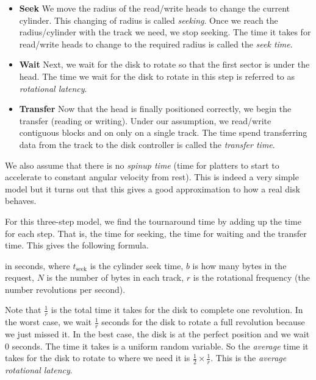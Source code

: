 \begin{itemize}   
\renewcommand{\labelitemi}{$\Box$}
\item \textbf{Seek}
We move the radius of the read/write heads to change the current cylinder.
This changing of radius is called \textit{seeking}. Once we reach the 
radius/cylinder with the track we need, we stop seeking.
The time it takes for read/write heads to change to the required radius is 
called the \textit{seek time}.
\item \textbf{Wait}
Next, we wait for the disk to rotate so that the first sector is under the head.
The time we wait for the disk to rotate in this step is referred to as 
\textit{rotational latency}.
\item \textbf{Transfer}
Now that the head is finally positioned correctly, we begin the transfer 
(reading or writing). Under our assumption, we read/write contiguous blocks 
and on only on a single track.
The time spend transferring data from the track to the disk controller
is called the \textit{transfer time}.
\end{itemize}

We also assume that there is no \textit{spinup time} 
(time for platters to start to accelerate to constant angular velocity from rest).
This is indeed a very simple model but it turns out that this gives a good
approximation to how a real disk behaves. 

For this three-step model, we find the tournaround time by adding up 
the time for each step. That is, the time for seeking, the time for waiting 
and the transfer time. This gives the following formula.


in seconds, where $t_{\text{seek}}$ is the cylinder seek time,
$b$ is how many bytes in the request, $N$ is the number of bytes in each track, 
$r$ is the rotational frequency (the number revolutions per second).

Note that $\frac{1}{r}$ is the total time it takes for the disk to complete one revolution. 
In the worst case, we wait $\frac{1}{r}$ seconds for the disk to rotate a full revolution 
because we just missed it. In the best case, the disk is at the perfect position and we 
wait 0 seconds. The time it takes is a uniform random variable. So the \textit{average} time 
it takes for the disk to rotate to where we need it is  
$\frac{1}{2} \times \frac{1}{r}$. This is the \textit{average rotational latency}. 

